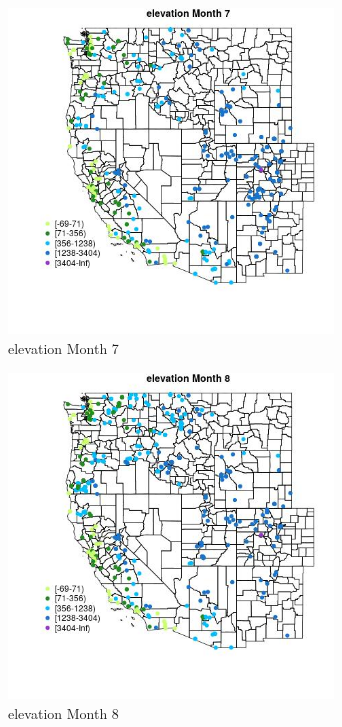 \begin{figure} 
\centering  
\includegraphics[width=0.77\textwidth]{Code_Outputs/Report_ML_input_PM25_Step4_part_e_de_duplicated_aveswNAs_MapObsMo7elevation.jpg} 
\caption{\label{fig:Report_ML_input_PM25_Step4_part_e_de_duplicated_aveswNAsMapObsMo7elevation}elevation Month 7} 
\end{figure} 
 

\begin{figure} 
\centering  
\includegraphics[width=0.77\textwidth]{Code_Outputs/Report_ML_input_PM25_Step4_part_e_de_duplicated_aveswNAs_MapObsMo8elevation.jpg} 
\caption{\label{fig:Report_ML_input_PM25_Step4_part_e_de_duplicated_aveswNAsMapObsMo8elevation}elevation Month 8} 
\end{figure} 
 

